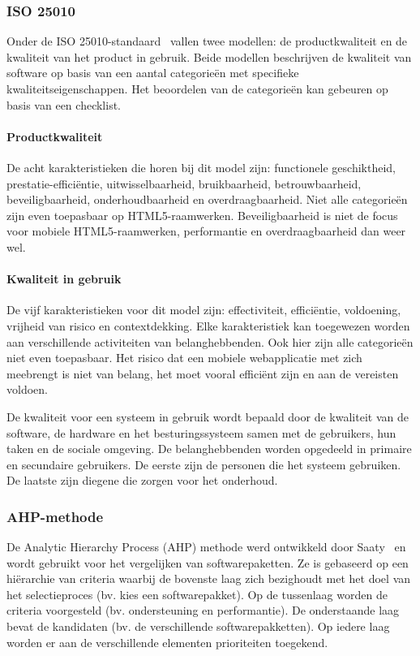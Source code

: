 \subsubsection{ISO 25010}
\label{sec:vergelijken-iso}
Onder de ISO 25010-standaard~\cite{Standard2010} vallen twee modellen:  de productkwaliteit en de kwaliteit van het product in gebruik.  
Beide modellen beschrijven de kwaliteit van software op basis van een aantal categorieën met specifieke kwaliteitseigenschappen. 
Het beoordelen van de categorieën kan gebeuren op basis van een checklist. 
 
\paragraph{Productkwaliteit}
De acht karakteristieken die horen bij dit model zijn: functionele geschiktheid,  prestatie-efficiëntie, uitwisselbaarheid,  bruikbaarheid,  betrouwbaarheid, beveiligbaarheid,  onderhoudbaarheid en overdraagbaarheid.   
Niet alle categorieën zijn even toepasbaar op HTML5-raamwerken.  
Beveiligbaarheid is niet de focus voor mobiele HTML5-raamwerken,  performantie en overdraagbaarheid dan weer wel.

\paragraph{Kwaliteit in gebruik}
De vijf karakteristieken voor dit model zijn: effectiviteit,  efficiëntie,  voldoening,  vrijheid van risico en contextdekking. 
Elke karakteristiek kan toegewezen worden aan verschillende activiteiten van belanghebbenden. 
Ook hier zijn alle categorieën niet even toepasbaar.  
Het risico dat een mobiele webapplicatie met zich meebrengt is niet van belang,  het moet vooral efficiënt zijn en aan de vereisten voldoen.

De kwaliteit voor een systeem in gebruik wordt bepaald door de kwaliteit van de software,  de hardware en het besturingssysteem samen met de gebruikers, hun taken en de sociale omgeving.  
De belanghebbenden worden opgedeeld in primaire en secundaire gebruikers.  
De eerste zijn de personen die het systeem gebruiken. 
De laatste zijn diegene die zorgen voor het onderhoud.

\subsubsection{AHP-methode}
\label{sec:vergelijken-ahp}
De Analytic Hierarchy Process (AHP) methode werd ontwikkeld door Saaty~\cite{Saaty1980} en wordt gebruikt voor het vergelijken van softwarepaketten.
Ze is gebaseerd op een hiërarchie van criteria waarbij de bovenste laag zich bezighoudt met het doel van het selectieproces (bv. kies een softwarepakket).
Op de tussenlaag worden de criteria voorgesteld (bv. ondersteuning en performantie).
De onderstaande laag bevat de kandidaten (bv. de verschillende softwarepakketten).
Op iedere laag worden er aan de verschillende elementen prioriteiten toegekend.

